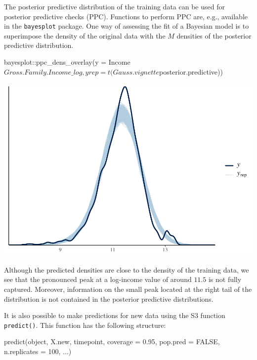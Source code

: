 \documentclass[a4paper, preprint, 3p,
authoryear]{elsarticle} %
\newenvironment{Shaded}{\begin{snugshade}}{\end{snugshade}}
\newcommand{\NormalTok}[1]{#1}
\newcommand{\pandocbounded}[1]{#1}
\begin{document}
The posterior predictive distribution of the training data can be used
for posterior predictive checks (PPC). Functions to perform PPC are,
e.g., available in the \texttt{bayesplot} package. One way of assessing
the fit of a Bayesian model is to superimpose the density of the
original data with the \(M\) densities of the posterior predictive
distribution.

\begin{Shaded}
\begin{Highlighting}[]
\NormalTok{bayesplot::ppc\_dens\_overlay(y = Income$Gross.Family.Income\_log,}
\NormalTok{                            yrep = t(Gauss.vignette$posterior.predictive))}
\end{Highlighting}
\end{Shaded}

\pandocbounded{\includegraphics[keepaspectratio]{Vignette-for-panelTVP_files/figure-latex/unnamed-chunk-22-1.pdf}}

Although the predicted densities are close to the density of the
training data, we see that the pronounced peak at a log-income value of
around \(11.5\) is not fully captured. Moreover, information on the
small peak located at the right tail of the distribution is not
contained in the posterior predictive distributions.

It is also possible to make predictions for new data using the S3
function \texttt{predict()}. This function has the following structure:

\begin{Shaded}
\begin{Highlighting}[]
\NormalTok{predict(object, X.new, timepoint, coverage = 0.95,}
\NormalTok{        pop.pred = FALSE, n.replicates = 100, ...)}
\end{Highlighting}
\end{Shaded}
\end{document}
